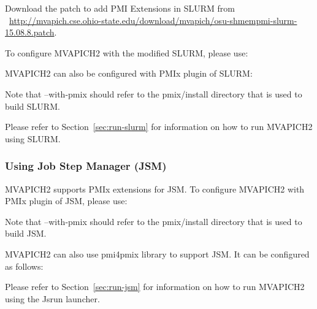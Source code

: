 Download the patch to add PMI Extensions in SLURM from \\
~\href{http://mvapich.cse.ohio-state.edu/download/mvapich/osu-shmempmi-slurm-15.08.8.patch}{http://mvapich.cse.ohio-state.edu/download/\linebreak[0]mvapich/osu-shmempmi-slurm-15.08.8.patch}.


To configure MVAPICH2 with the modified SLURM, please use:


MVAPICH2 can also be configured with PMIx plugin of SLURM:


Note that --with-pmix should refer to the pmix/install directory that is used to build SLURM.

Please refer to Section~\ref{sec:run-slurm} for information on how to run MVAPICH2 using
SLURM.


\subsubsection{Using Job Step Manager (JSM)}
\label{subsec:config-jsm}

MVAPICH2 supports PMIx extensions for JSM. To configure MVAPICH2 with PMIx plugin of JSM, please use:


Note that --with-pmix should refer to the pmix/install directory that is used to build JSM.

MVAPICH2 can also use pmi4pmix library to support JSM. It can be configured as follows:


Please refer to Section~\ref{sec:run-jsm} for information on how to run MVAPICH2
using the Jsrun launcher.

